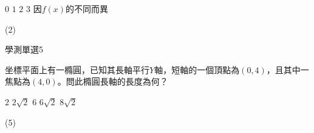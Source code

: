 \begin{QUESTIONS}
\begin{QUESTION}
\begin{QBODY}
            \begin{QOPS} 
                \QOP $0$	
                \QOP $1$	
                \QOP $2$
                \QOP $3$	
                \QOP 因$f\left( x \right)$的不同而異
            \end{QOPS}            
        \end{QBODY}
        \begin{QFROMS}
        \end{QFROMS}
        \begin{QTAGS}\end{QTAGS}
        \begin{QANS}
            (2)
        \end{QANS}
        \begin{QSOLLIST}
        \end{QSOLLIST}
        \begin{QEMPTYSPACE}
        \end{QEMPTYSPACE}
    \end{QUESTION}
    \begin{QUESTION}
        \begin{ExamInfo}{85}{學測}{單選}{5}
        \end{ExamInfo}
        \begin{ExamAnsRateInfo}{}{}{}{}
        \end{ExamAnsRateInfo}
        \begin{QBODY}
            	坐標平面上有一橢圓，已知其長軸平行$Y$軸，短軸的一個頂點為$\left( 0,4 \right)$，且其中一焦點為$\left( 4,0 \right)$。問此橢圓長軸的長度為何？
            \begin{QOPS} 
 \QOP$2$	
            \QOP$2\sqrt{2}$	
            \QOP$6$
            \QOP$6\sqrt{2}$	
            \QOP$8\sqrt{2}$
            \end{QOPS}            
        \end{QBODY}
        \begin{QFROMS}
        \end{QFROMS}
        \begin{QTAGS}\end{QTAGS}
        \begin{QANS}
            (5)
        \end{QANS}
        \begin{QSOLLIST}
        \end{QSOLLIST}
        \begin{QEMPTYSPACE}
        \end{QEMPTYSPACE}
    \end{QUESTION}

\end{QUESTIONS}
